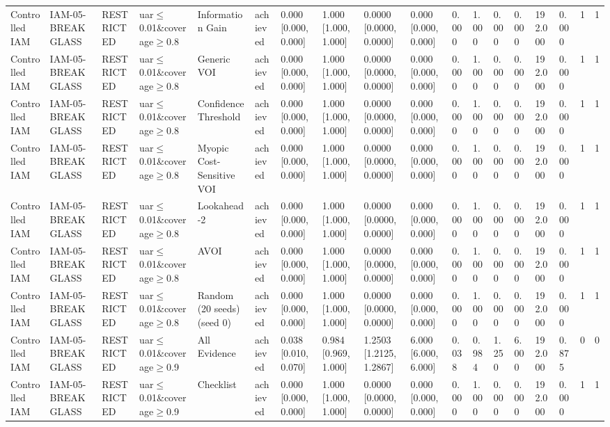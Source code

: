 \begin{table}[!ht]
{\begin{tabular}{llllllllllllllllll}
Controlled IAM & IAM-05-BREAKGLASS & RESTRICTED & uar$\le$0.01\&coverage$\ge$0.8 & Information Gain & achieved & 0.000 [0.000, 0.000] & 1.000 [1.000, 1.000] & 0.0000 [0.0000, 0.0000] & 0.000 [0.000, 0.000] & 0.000 & 1.000 & 0.000 & 0.000 & 192.000 & 0.000 & 1 & 1 \\
Controlled IAM & IAM-05-BREAKGLASS & RESTRICTED & uar$\le$0.01\&coverage$\ge$0.8 & Generic VOI & achieved & 0.000 [0.000, 0.000] & 1.000 [1.000, 1.000] & 0.0000 [0.0000, 0.0000] & 0.000 [0.000, 0.000] & 0.000 & 1.000 & 0.000 & 0.000 & 192.000 & 0.000 & 1 & 1 \\
Controlled IAM & IAM-05-BREAKGLASS & RESTRICTED & uar$\le$0.01\&coverage$\ge$0.8 & Confidence Threshold & achieved & 0.000 [0.000, 0.000] & 1.000 [1.000, 1.000] & 0.0000 [0.0000, 0.0000] & 0.000 [0.000, 0.000] & 0.000 & 1.000 & 0.000 & 0.000 & 192.000 & 0.000 & 1 & 1 \\
Controlled IAM & IAM-05-BREAKGLASS & RESTRICTED & uar$\le$0.01\&coverage$\ge$0.8 & Myopic Cost-Sensitive VOI & achieved & 0.000 [0.000, 0.000] & 1.000 [1.000, 1.000] & 0.0000 [0.0000, 0.0000] & 0.000 [0.000, 0.000] & 0.000 & 1.000 & 0.000 & 0.000 & 192.000 & 0.000 & 1 & 1 \\
Controlled IAM & IAM-05-BREAKGLASS & RESTRICTED & uar$\le$0.01\&coverage$\ge$0.8 & Lookahead-2 & achieved & 0.000 [0.000, 0.000] & 1.000 [1.000, 1.000] & 0.0000 [0.0000, 0.0000] & 0.000 [0.000, 0.000] & 0.000 & 1.000 & 0.000 & 0.000 & 192.000 & 0.000 & 1 & 1 \\
Controlled IAM & IAM-05-BREAKGLASS & RESTRICTED & uar$\le$0.01\&coverage$\ge$0.8 & AVOI & achieved & 0.000 [0.000, 0.000] & 1.000 [1.000, 1.000] & 0.0000 [0.0000, 0.0000] & 0.000 [0.000, 0.000] & 0.000 & 1.000 & 0.000 & 0.000 & 192.000 & 0.000 & 1 & 1 \\
Controlled IAM & IAM-05-BREAKGLASS & RESTRICTED & uar$\le$0.01\&coverage$\ge$0.8 & Random (20 seeds) (seed 0) & achieved & 0.000 [0.000, 0.000] & 1.000 [1.000, 1.000] & 0.0000 [0.0000, 0.0000] & 0.000 [0.000, 0.000] & 0.000 & 1.000 & 0.000 & 0.000 & 192.000 & 0.000 & 1 & 1 \\
Controlled IAM & IAM-05-BREAKGLASS & RESTRICTED & uar$\le$0.01\&coverage$\ge$0.9 & All Evidence & achieved & 0.038 [0.010, 0.070] & 0.984 [0.969, 1.000] & 1.2503 [1.2125, 1.2867] & 6.000 [6.000, 6.000] & 0.038 & 0.984 & 1.250 & 6.000 & 192.000 & 0.875 & 0 & 0 \\
Controlled IAM & IAM-05-BREAKGLASS & RESTRICTED & uar$\le$0.01\&coverage$\ge$0.9 & Checklist & achieved & 0.000 [0.000, 0.000] & 1.000 [1.000, 1.000] & 0.0000 [0.0000, 0.0000] & 0.000 [0.000, 0.000] & 0.000 & 1.000 & 0.000 & 0.000 & 192.000 & 0.000 & 1 & 1 \\

\end{tabular}}
\end{table}
